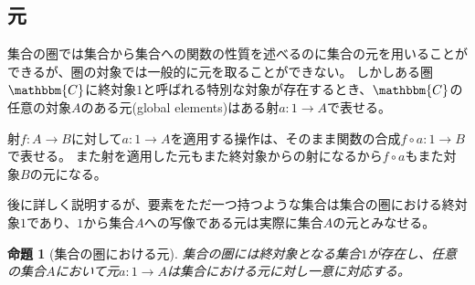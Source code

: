 \documentclass[dvipdfmx]{jsarticle}
\newcommand{\cat}[1]{\mathbbm{#1}}
\newcommand{\arrow}{\rightarrow}
\newcommand{\mor}[3]{#1:#2\arrow #3}
\newtheorem{prop}{命題}[section]
\numberwithin{proof}{subsection}
\numberwithin{prop}{subsection}
\numberwithin{define}{subsection}
\begin{document}
	\subsection{元}
		集合の圏では集合から集合への関数の性質を述べるのに集合の元を用いることができるが、圏の対象では一般的に元を取ることができない。
		しかしある圏$\cat{C}$に終対象$1$と呼ばれる特別な対象が存在するとき、$\cat{C}$の任意の対象$A$のある元(global elements)はある射$\mor{a}{1}{A}$で表せる。
		\begin{center}
		\end{center}

		射$\mor{f}{A}{B}$に対して$\mor{a}{1}{A}$を適用する操作は、そのまま関数の合成$\mor{f\circ a}{1}{B}$で表せる。
		また射を適用した元もまた終対象からの射になるから$f\circ a$もまた対象$B$の元になる。

		後に詳しく説明するが、要素をただ一つ持つような集合は集合の圏における終対象$1$であり、$1$から集合$A$への写像である元は実際に集合$A$の元とみなせる。
		\begin{prop}[集合の圏における元]
			集合の圏には終対象となる集合$1$が存在し、任意の集合$A$において元$\mor{a}{1}{A}$は集合における元に対し一意に対応する。
		\end{prop}
\end{document}
